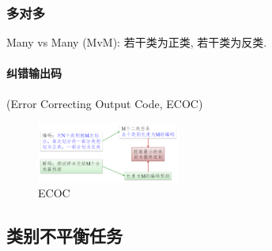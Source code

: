 \subsubsection{多对多}
Many vs Many (MvM): 若干类为正类, 若干类为反类. 

\paragraph{纠错输出码} (Error Correcting Output Code, ECOC)

\begin{figure}[!htb]
    \centering
    \includegraphics[width=0.42\textwidth]{pic/ML3/ECOC}
    \caption{ECOC}
\end{figure}



\subsection{类别不平衡任务}

